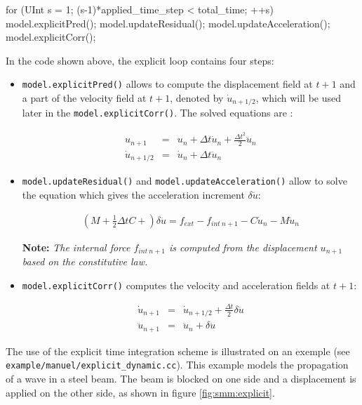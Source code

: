 \documentclass[a4paper,11pt]{book}
\newcommand{\code}[1]{\texttt{#1}}
\newcommand{\note}[1]{\textbf{Note: }\textit{#1}}
\begin{document}
\begin{cpp}
  for (UInt s = 1; (s-1)*applied_time_step < total_time; ++s) {
    model.explicitPred();
    model.updateResidual();
    model.updateAcceleration();
    model.explicitCorr();
  }
\end{cpp}

In the code shown above, the explicit loop contains four steps:
\begin{itemize}
\item \code{model.explicitPred()} allows to compute the displacement field at $t+1$ and a 
part of the velocity field at $t+1$, denoted by $\dot{u}_{n+1/2}$, which will be used later in 
the \code{model.explicitCorr()}. The solved equations are :

\begin{eqnarray}
  u_{n+1}        &=& u_{n} +  \Delta t \dot{u}_{n} + \frac{\Delta t^2}{2} \ddot{u}_{n} \\
  \dot{u}_{n+1/2}  &=& \dot{u}_{n} +  \Delta t  \ddot{u}_{n}
  \label{eqn:smm:explicit:onehalfvelocity}
\end{eqnarray}

\item \code{model.updateResidual()} and \code{model.updateAcceleration()} allow to 
solve the equation which gives the acceleration increment $\delta \ddot{u}$:

\begin{eqnarray}
 (M + \frac{1}{2} \Delta t C + ) \delta \ddot{u} = f_{ext} - f_{int~n+1} - C \dot{u}_{n} - M \ddot{u}_{n}
\end{eqnarray}

\note{The internal force $f_{int~n+1}$ is computed from the displacement $u_{n+1}$ based on the constitutive law.} 

\item \code{model.explicitCorr()} computes the velocity and acceleration fields at $t+1$:

\begin{eqnarray}
\dot{u}_{n+1}  &=& \dot{u}_{n+1/2} + \frac{\Delta t}{2} \delta \ddot{u} \\
\ddot{u}_{n+1}  &=& \ddot{u}_{n} +  \delta \ddot{u}
\end{eqnarray}

\end{itemize}
The use of the explicit time integration scheme is illustrated on an exemple
(see \code{example/manuel/explicit\_dynamic.cc}).
This example models the propagation of a wave in a steel beam. The beam 
is blocked on one side and a displacement is applied on the other side, as shown in figure \ref{fig:smm:explicit}. 
\end{document}

